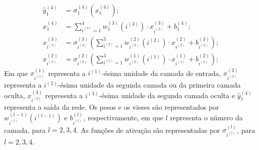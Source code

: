\begin{equation}
    \label{eq:redeNeural}
    \begin{aligned}
        \hat{y}_1^{(4)} &= \sigma_1^{(4)}\left(x_1^{(4)}\right); \\
        x_1^{(4)} &= \sum_{i^{(3)}=1}^4 w_1^{(3)}(i^{(3)})\cdot x^{(3)}_{i^{(3)}} + b_1^{(4)}; \\
        x^{(3)}_{i^{(3)}} &= \sigma_{i^{(3)}}^{(3)}\left(\sum_{i^{(2)}=1}^5 w_{i^{(3)}}^{(2)}(i^{(2)})\cdot x^{(2)}_{i^{(2)}} + b_{i^{(3)}}^{(3)}\right); \\
        x^{(2)}_{i^{(2)}} &= \sigma_{i^{(2)}}^{(2)}\left(\sum_{i^{(1)}=1}^3 w_{i^{(2)}}^{(1)}(i^{(1)})\cdot x^{(1)}_{i^{(1)}} + b_{i^{(2)}}^{(2)}\right);        
    \end{aligned}
\end{equation}
Em que $x^{(1)}_{i^{(1)}}$ representa a $i^{(1)}$-ésima unidade da camada de entrada, $x^{(2)}_{i^{(2)}}$ representa a $i^{(2)}$-ésima unidade da segunda camada ou da primeira camada oculta, $x^{(3)}_{i^{(3)}}$ representa a $i^{(3)}$-ésima unidade da segunda camada oculta e $\hat{y}_1^{(4)}$ representa a saída da rede. Os pesos e os vieses são representados por $w_{i^{(l)}}^{(l-1)}(i^{(l-1)})$ e $b_{i^{(l)}}^{(l)}$, respectivamente, em que $l$ representa o número da camada, para $l = 2, 3, 4$. As funções de ativação são representadas por $\sigma_{i^{(l)}}^{(l)}$, para $l = 2, 3, 4$.

